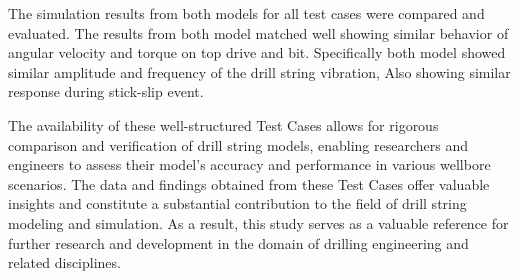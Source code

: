 The simulation results from both models for all test cases were compared and evaluated. The results from both model matched well showing similar behavior of angular velocity and torque on top drive and bit. Specifically both model showed similar amplitude and frequency of the drill string vibration, Also showing similar response during stick-slip event.

The availability of these well-structured Test Cases allows for rigorous comparison and verification of drill string models, enabling researchers and engineers to assess their model's accuracy and performance in various wellbore scenarios. The data and findings obtained from these Test Cases offer valuable insights and constitute a substantial contribution to the field of drill string modeling and simulation. As a result, this study serves as a valuable reference for further research and development in the domain of drilling engineering and related disciplines. 
